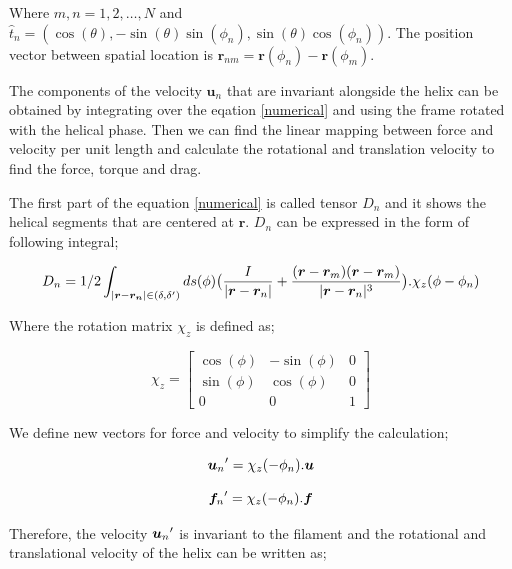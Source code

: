 \documentclass[12pt,a4paper,titlepage]{report}
\begin{document}
Where $m,n = 1,2, \dots ,N$ and $\hat{t}_n=(\cos(\theta), -\sin(\theta)\sin(\phi_n), \sin(\theta)\cos(\phi_n))$.
The position vector between spatial location is $\bm{r}_{nm} = \bm{r}(\phi_n)- \bm{r}(\phi_m)$.

The components of the velocity $\bm{u}_n$ that are invariant alongside the helix can be obtained by 
integrating over the eqation \ref{numerical} and using the frame rotated with the helical phase. Then we can
find the linear mapping between force and velocity per unit length and calculate the rotational and translation velocity
to find the force, torque and drag.

The first part of the equation \ref{numerical} is called tensor $D_n$ and it shows the helical segments that
are centered at $\bm{r}$. $D_n$ can be expressed in the form of following integral;


\begin{equation}
D_n = 1/2 \int_{|\bm{r}-\bm{r_n}| \in (\delta, \delta \rq{})} ds(\phi) \big(\frac{I}{|\bm{r}-\bm{r}_n|} + \frac{(\bm{r} -\bm{r}_m)(\bm{r} -\bm{r}_m)}{|\bm{r}-\bm{r}_n|^3} \big). \chi_z(\phi-\phi_n)
\label{functionD}
\end{equation}


Where the rotation matrix $\chi_z$ is defined as;



\begin{equation}
  \chi_z = \begin{bmatrix}
       \cos(\phi)  &  -\sin(\phi) 		 & 0           \\[0.4em]
       \sin(\phi)		 & \cos(\phi)           & 0\\[0.4em]
       0           	& 0 		&  1
     \end{bmatrix}
\label{rotationOperator}
\end{equation}

We define new vectors for force and velocity to simplify the calculation;



\begin{equation}
{\bm{u}_n}\rq{}= \chi_z(-\phi_n). \bm{u}
\label{NewVelo}
\end{equation}

\begin{equation}
{\bm{f}_n}\rq{}= \chi_z(-\phi_n). \bm{f}
\label{NewForce}
\end{equation}

Therefore, the velocity ${\bm{u}_n}\rq{}$ is invariant to the filament and the rotational and translational velocity 
of the helix can be written as;
\end{document}
